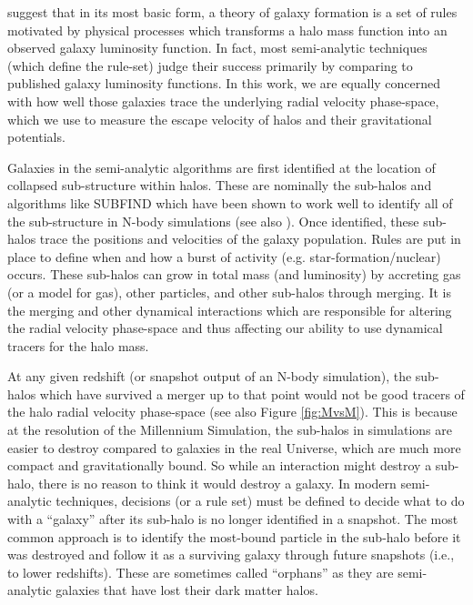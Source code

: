 \documentclass[iop]{emulateapj}
\begin{document}
    \citet{Bower06} suggest that in its most basic form, a theory of galaxy formation is a set of rules motivated by physical processes which transforms a halo mass function into an observed galaxy luminosity function. In fact, most semi-analytic techniques (which define the rule-set) judge their success primarily by comparing to published galaxy luminosity functions. In this work, we are equally concerned with how well those galaxies trace the underlying radial velocity phase-space, which we use to measure the escape velocity of halos and their gravitational potentials.

Galaxies in the semi-analytic algorithms are first identified at the location of collapsed sub-structure within halos. These are nominally the sub-halos and algorithms like SUBFIND \citep{Springel01} which have been shown to work well to identify all of the sub-structure in N-body simulations (see also \citet{Knebe11}). Once identified, these sub-halos trace the positions and velocities of the galaxy population. Rules are put in place to define when and how a burst of activity (e.g. star-formation/nuclear) occurs. These sub-halos can grow in total mass (and luminosity) by accreting gas (or a model for gas), other particles, and other sub-halos through merging. It is the merging and other dynamical interactions which are responsible for altering the radial velocity phase-space and thus affecting our ability to use dynamical tracers for the halo mass.

At any given redshift (or snapshot output of an N-body simulation), the sub-halos which have survived a merger up to that point would not be good tracers of the halo radial velocity phase-space (see also Figure \ref{fig:MvsM}). This is because at the resolution of the Millennium Simulation, the sub-halos in simulations are easier to destroy compared to galaxies in the real Universe, which are much more compact and gravitationally bound. So while an interaction might destroy a sub-halo, there is no reason to think it would destroy a galaxy. In modern semi-analytic techniques, decisions (or a rule set) must be defined to decide what to do with a ``galaxy'' after its sub-halo is no longer identified in a snapshot. The most common approach is to identify the most-bound particle in the sub-halo before it was destroyed and follow it as a surviving galaxy through future snapshots (i.e., to lower redshifts). These are sometimes called ``orphans'' as they are semi-analytic galaxies that have lost their dark matter halos.
\end{document}
